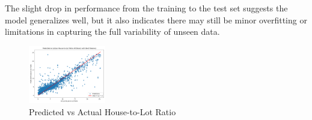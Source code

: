 The slight drop in performance from the training to the test set suggests the model
generalizes well, but it also indicates there may still be minor overfitting or
limitations in capturing the full variability of unseen data.

\begin{figure}[h!]
	\centering
	\includegraphics[width=0.3\textwidth]{
		Sections/Final Model.png
	} %
	\caption{Predicted vs Actual House-to-Lot Ratio}
\end{figure}